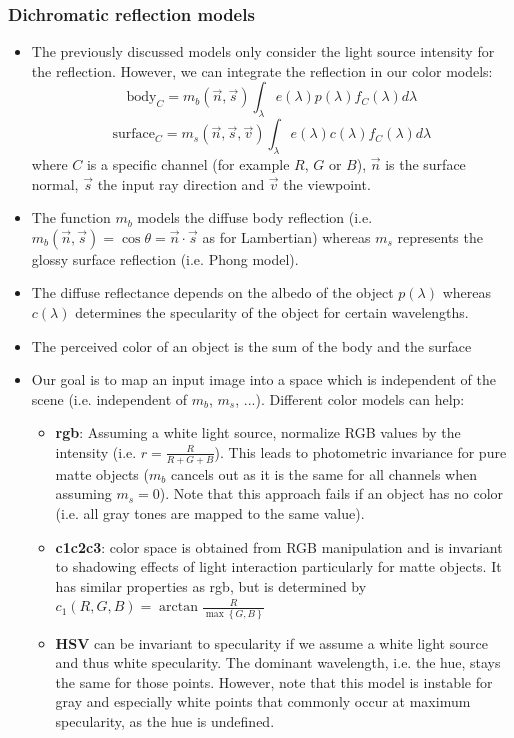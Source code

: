 \subsubsection{Dichromatic reflection models}
\begin{itemize}
	\item The previously discussed models only consider the light source intensity for the reflection. However, we can integrate the reflection in our color models:
	$$\text{body}_C = m_b (\vec{n}, \vec{s})  \int_\lambda e(\lambda) p(\lambda) f_C(\lambda) d\lambda$$
	$$\text{surface}_C = m_s (\vec{n}, \vec{s}, \vec{v})  \int_\lambda e(\lambda) c(\lambda) f_C(\lambda) d\lambda$$
	where $C$ is a specific channel (for example $R$, $G$ or $B$), $\vec{n}$ is the surface normal, $\vec{s}$ the input ray direction and $\vec{v}$ the viewpoint. 
	\item The function $m_b$ models the diffuse body reflection (i.e. $m_b(\vec{n}, \vec{s})=\cos \theta = \vec{n}\cdot \vec{s}$ as for Lambertian) whereas $m_s$ represents the glossy surface reflection (i.e. Phong model). 
	\item The diffuse reflectance depends on the albedo of the object $p(\lambda)$ whereas $c(\lambda)$ determines the specularity of the object for certain wavelengths.
	\item The perceived color of an object is the sum of the body and the surface
	\item Our goal is to map an input image into a space which is independent of the scene (i.e. independent of $m_b$, $m_s$, ...). Different color models can help:
	\begin{itemize}
		\item \textbf{rgb}: Assuming a white light source, normalize RGB values by the intensity (i.e. $r=\frac{R}{R+G+B}$). This leads to photometric invariance for pure matte objects ($m_b$ cancels out as it is the same for all channels when assuming $m_s=0$). Note that this approach fails if an object has no color (i.e. all gray tones are mapped to the same value).
		\item \textbf{c1c2c3}: color space is obtained from RGB manipulation and is invariant to shadowing effects of light interaction particularly for matte objects. It has similar properties as rgb, but is determined by $c_1(R,G,B) = \arctan\frac{R}{\max\left\{G,B\right\}}$
		\item \textbf{HSV} can be invariant to specularity if we assume a white light source and thus white specularity. The dominant wavelength, i.e. the hue, stays the same for those points. However, note that this model is instable for gray and especially white points that commonly occur at maximum specularity, as the hue is undefined.

\end{itemize}
\end{itemize}
